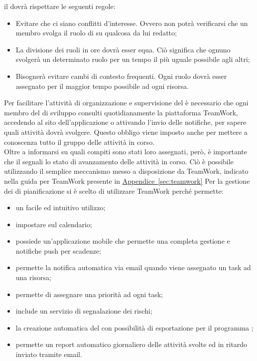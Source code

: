 			il  dovrà rispettare le seguenti regole:
			\begin{itemize}
				\item Evitare che ci siano conflitti d'interesse. Ovvero non potrà verificarsi che un membro svolga il ruolo di 
				su qualcosa da lui redatto;
				\item La divisione dei ruoli in ore dovrà esser equa. Ciò significa che ognuno svolgerà un determinato ruolo per un tempo il più
				uguale possibile agli altri;
				\item Bisognerà evitare cambi di contesto frequenti. Ogni ruolo dovrà esser assegnato per il maggior tempo possibile ad ogni risorsa.
			\end{itemize}
		 \label{subsec:aggiornamentoStatoTicket}
			Per facilitare l'attività di organizzazione e supervisione del  è necessario che ogni membro del  di sviluppo consulti quotidianamente la piattaforma TeamWork, accedendo al sito dell'applicazione o attivando l'invio delle notifiche, per sapere quali attività dovrà svolgere. Questo obbligo viene imposto anche per mettere a conoscenza tutto il gruppo delle attività in corso.\\
			Oltre a informarsi su quali compiti sono stati loro assegnati, però, è importante che il  segnali lo stato di avanzamento delle attività in corso. Ciò è possibile utilizzando il semplice meccanismo messo a disposizione da TeamWork, indicato nella guida per TeamWork presente in \hyperref[sec:teamwork]{Appendice~\ref*{sec:teamwork}}
			Per la gestione dei  di pianificazione si è scelto di utilizzare TeamWork perché permette:
			\begin{itemize}
				\item un facile ed intuitivo utilizzo;
				\item impostare  sul calendario;
				\item possiede un'applicazione mobile che permette una completa gestione e notifiche push per scadenze;
				\item permette la notifica automatica via email quando viene assegnato un task ad una risorsa;
				\item permette di assegnare una priorità ad ogni task;
				\item include un servizio di segnalazione dei rischi;
				\item la creazione automatica del  con possibilità di esportazione per il programma ;
				\item permette un report automatico giornaliero delle attività svolte ed in ritardo inviato tramite email.
			\end{itemize}

